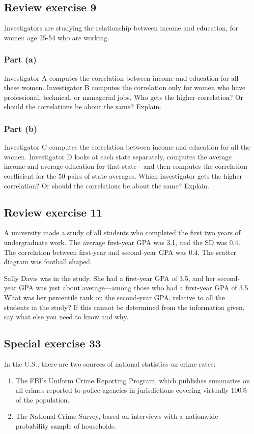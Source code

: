 \documentclass[11pt]{article}
\begin{document}
\subsection*{Review exercise 9} %
Investigators are studying the relationship between income and education, for women age 25-54 who are working.
\subsubsection*{Part (a)}
Investigator A computes the correlation between income and education for all these women.
Investigator B computes the correlation only for women who have professional, technical, or managerial jobs.
Who gets the higher correlation?
Or should the correlations be about the same?
Explain.

\subsubsection*{Part (b)}
Investigator C computes the correlation between income and education for all the women.
Investigator D looks at each state separately, computes the average income and average education for that state---and then computes the correlation coefficient for the 50 pairs of state averages.
Which investigator gets the higher correlation?
Or should the correlations be about the same?
Explain.

\subsection*{Review exercise 11} %
A university made a study of all students who completed the first two years of undergraduate work.
The average first-year GPA was 3.1, and the SD was 0.4.
The correlation between first-year and second-year GPA was 0.4.
The scatter diagram was football shaped.

Sally Davis was in the study.
She had a first-year GPA of 3.5, and her second-year GPA was just about average---among those who had a first-year GPA of 3.5.
What was her percentile rank on the second-year GPA, relative to all the students in the study?
If this cannot be determined from the information given, say what else you need to know and why.



\subsection*{Special exercise 33} %
In the U.S., there are two sources of national statistics on crime rates:
\begin{enumerate}[i]
	\item The FBI's Uniform Crime Reporting Program, which publishes summaries on all crimes reported to police agencies in jurisdictions covering virtually 100\% of the population.
	\item The National Crime Survey, based on interviews with a nationwide probability sample of households.
\end{enumerate}
\end{document}
